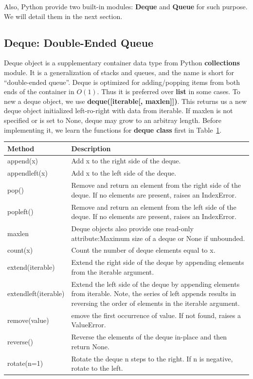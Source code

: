 \documentclass[../main.tex]{subfiles}
\begin{document}
Also, Python provide two built-in modules: \textbf{Deque} and \textbf{Queue} for such purpose. We will detail them in the next section. 
\subsection{Deque: Double-Ended Queue}
Deque object is a supplementary container data type from Python \textbf{collections} module. It is a generalization of stacks and queues, and the name is short for ``double-ended queue''. Deque is optimized  for adding/popping items from both ends of the container in $O(1)$. Thus it is preferred over \textbf{list} in some cases. To new a deque object, we use \textbf{deque([iterable[, maxlen]])}. This returns us a new deque object initialized left-ro-right with data from iterable. If maxlen is not specified or is set to None, deque may grow to an arbitray length. Before implementing it, we learn the functions for \textbf{deque class} first in Table~\ref{tab:common_operation_deque}. 
\begin{table}[h]
\begin{small}
\centering
\noindent{}
 \noindent \begin{tabular}{|p{}|p{}| }
  \hline
Method & Description   \\ \hline
append(x)  & Add x to the right side of the deque. \\\hline
appendleft(x)  &Add x to the left side of the deque.\\ \hline
pop()  &Remove and return an element from the right side of the deque. If no elements are present, raises an IndexError.\\ \hline
popleft() &Remove and return an element from the left side of the deque. If no elements are present, raises an IndexError.\\ \hline
maxlen & Deque objects also provide one read-only attribute:Maximum size of a deque or None if unbounded.\\ \hline
count(x)  &Count the number of deque elements equal to x.\\ \hline
extend(iterable) &Extend the right side of the deque by appending elements from the iterable argument.\\ \hline
extendleft(iterable) &Extend the left side of the deque by appending elements from iterable. Note, the series of left appends results in reversing the order of elements in the iterable argument.\\ \hline
remove(value) &emove the first occurrence of value. If not found, raises a ValueError.\\ \hline
reverse() &Reverse the elements of the deque in-place and then return None.\\ \hline
rotate(n=1) &Rotate the deque n steps to the right. If n is negative, rotate to the left.\\ \hline
\end{tabular}
  \label{tab:common_operation_deque}
  \end{small}
\end{table}
\end{document}
